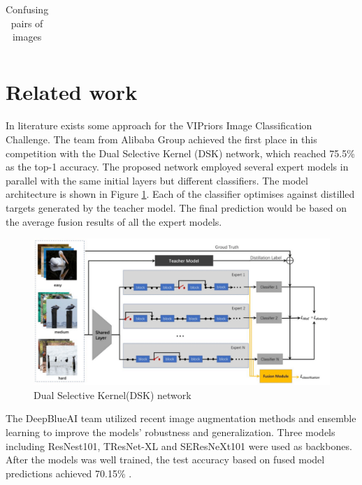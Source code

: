 \documentclass{article}
\begin{document}
\begin{table}[]
\begin{tabular}{|c c|}
\begin{minipage}{.4\linewidth}
    \end{minipage}\\
     \hline
    \end{tabular}
    \caption{Confusing pairs of images}
    \label{tab:pairs}
\end{table}



\section{Related work}
\label{sec:relwork}
In literature exists some approach for the VIPriors Image Classification Challenge. The team from Alibaba Group achieved the first place in this competition with the Dual Selective Kernel (DSK) network\cite{sun2020visual}, which reached 75.5\% as the top-1 accuracy. The proposed network employed several expert models in parallel with the same initial layers but different classifiers. The model architecture is shown in Figure \ref{alibaba}. Each of the classifier optimises against distilled targets generated by the teacher model. The final prediction would be based on the average fusion results of all the expert models. 

\begin{figure}[H]
\centerline{\includegraphics[scale=0.25]{alibaba.pdf}}
\caption{Dual Selective Kernel(DSK) network\cite{lengyel2022vipriors}}
\label{alibaba}
\end{figure}

The DeepBlueAI team utilized recent image augmentation methods and ensemble learning to improve the models’ robustness and generalization. Three models including ResNest101\cite{zhang2020resnest}, TResNet-XL\cite{ridnik2021tresnet} and SEResNeXt101\cite{hu2018squeeze} were used as backbones. After the models was well trained, the test accuracy based on fused model predictions achieved 70.15\% \cite{luo2020technical}.
\end{document}
